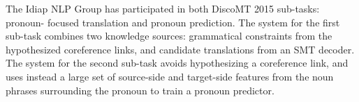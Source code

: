 The Idiap NLP Group has participated in both DiscoMT 2015 sub-tasks: pronoun- focused translation and pronoun prediction. The system for the first sub-task combines two knowledge sources: grammatical constraints from the hypothesized coreference links, and candidate translations from an SMT decoder. The system for the second sub-task avoids hypothesizing a coreference link, and uses instead a large set of source-side and target-side features from the noun phrases surrounding the pronoun to train a pronoun predictor.
